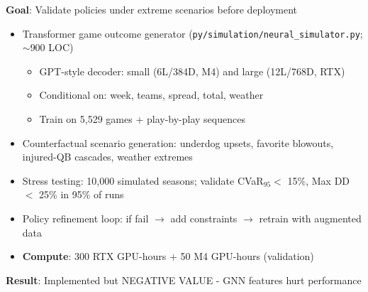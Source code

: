 \textbf{Goal}: Validate policies under extreme scenarios before deployment

\begin{itemize}
  \item {} Transformer game outcome generator (\texttt{py/simulation/neural\_simulator.py}; $\sim$900 LOC)
  \begin{itemize}
    \item GPT-style decoder: small (6L/384D, M4) and large (12L/768D, RTX)
    \item Conditional on: week, teams, spread, total, weather
    \item Train on 5,529 games + play-by-play sequences
  \end{itemize}
  \item {} Counterfactual scenario generation: underdog upsets, favorite blowouts, injured-QB cascades, weather extremes
  \item {} Stress testing: 10,000 simulated seasons; validate CVaR$_{95} <$ 15\%, Max DD $<$ 25\% in 95\% of runs
  \item {} Policy refinement loop: if fail $\to$ add constraints $\to$ retrain with augmented data
  \item \textbf{Compute}: 300 RTX GPU-hours + 50 M4 GPU-hours (validation)
\end{itemize}

\textbf{Result}: Implemented but NEGATIVE VALUE - GNN features hurt performance

